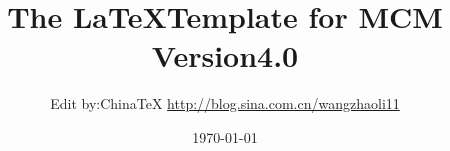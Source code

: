 \documentclass[a4paper,12pt]{article}%
\title{The \LaTeX Template for  MCM Version4.0}
\author{\small Edit by:China\TeX{} \url{http://blog.sina.com.cn/wangzhaoli11}}
\date{\today}
\theoremstyle{definition}
\begin{document}
\maketitle
                                              
\newpage                                                          
\tableofcontents                                                  
\newpage                                                          






\balance


\end{document}
